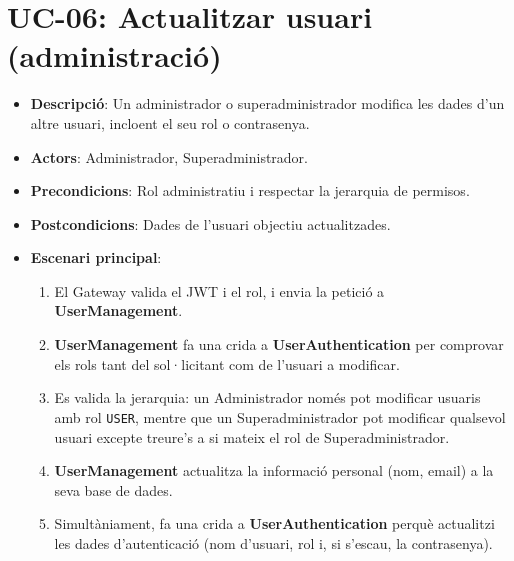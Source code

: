 \section{UC-06: Actualitzar usuari (administració)}
\begin{itemize}
    \item \textbf{Descripció}: Un administrador o superadministrador modifica les dades d'un altre usuari, incloent el seu rol o contrasenya.
    \item \textbf{Actors}: Administrador, Superadministrador.
    \item \textbf{Precondicions}: Rol administratiu i respectar la jerarquia de permisos.
    \item \textbf{Postcondicions}: Dades de l'usuari objectiu actualitzades.
    \item \textbf{Escenari principal}:
    \begin{enumerate}
        \item El Gateway valida el JWT i el rol, i envia la petició a \textbf{UserManagement}.
        \item \textbf{UserManagement} fa una crida a \textbf{UserAuthentication} per comprovar els rols tant del sol·licitant com de l'usuari a modificar.
        \item Es valida la jerarquia: un Administrador només pot modificar usuaris amb rol \texttt{USER}, mentre que un Superadministrador pot modificar qualsevol usuari excepte treure's a si mateix el rol de Superadministrador.
        \item \textbf{UserManagement} actualitza la informació personal (nom, email) a la seva base de dades.
        \item Simultàniament, fa una crida a \textbf{UserAuthentication} perquè actualitzi les dades d'autenticació (nom d'usuari, rol i, si s'escau, la contrasenya).
    \end{enumerate}
\end{itemize}

